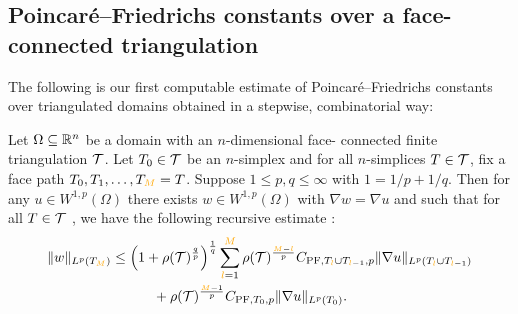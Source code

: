 \documentclass[10pt,letterpaper]{article}
\newcommand\cye[1]{%
  \protect\leavevmode
  \begingroup
    \color{red!35!yellow}%
    #1%
  \endgroup
}
\begin{document}
\subsection{\cye{Poincar\'e--Friedrichs constants over a face-connected triangulation}}

\cye{The following is our first computable estimate of Poincar\'e--Friedrichs constants over triangulated domains obtained in a stepwise, combinatorial way:}

\begin{theorem}\label{theorem:poincarefriedrichsestimate:grad}
    Let $\Omega \subseteq {\mathbb R}^{n}$ be a domain with an \cye{$n$-dimensional} \cye{face-}connected finite triangulation ${\mathcal T}$.
    Let $T_0 \in {\mathcal T}$ be an $n$-simplex \cye{and} for all $n$-simplices $T \in {\mathcal T}$, 
    fix a \cye{face} path $T_0, T_1, \dots, T_{\cye{M}} = T$.
    Suppose $1 \leq p,q \leq \infty$ with $1 = 1/p + 1/q$.
    Then for any $u \in W^{1,p}(\Omega)$ 
    there exists $w \in W^{1,p}(\Omega)$ with $\nabla w = \nabla u$ 
    and such that for all $T \in {\mathcal T}$\cye{, we have the following recursive estimate}:
    \begin{align*} 
        \| w \|_{L^{p}(T_{\cye{M}})}
        &\leq 
        \left( 1 + \rho(\calT)^{\frac q p} \right)^{\frac 1 q}
        \sum_{\cye{l}=1}^{{\cye{M}}}
        \rho(\calT)^{\frac{{\cye{M}}-\cye{l}}{p}}
        C_{{\rm{PF}},T_{\cye{l}} \cup T_{\cye{l}-1},p}
        \| \nabla u \|_{L^{p}(T_{\cye{l}} \cup T_{\cye{l}-1})}
        \\&\quad \quad \quad 
        +
        \rho(\calT)^{\frac{{\cye{M}}-1}{p}}
        C_{{\rm{PF}},T_{0},p}
        \| \nabla u \|_{L^{p}(T_{0})}
        .
    \end{align*}
\end{theorem}
\end{document}
